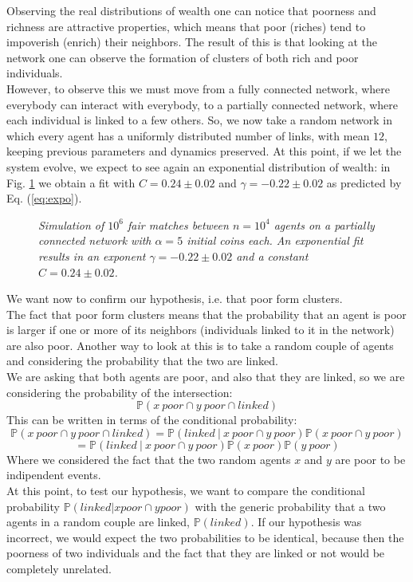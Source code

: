 Observing the real distributions of wealth one can notice that poorness and richness are attractive properties, which means that poor (riches) tend to impoverish (enrich) their neighbors.
The result of this is that looking at the network one can observe the formation of clusters of both rich and poor individuals. \\
However, to observe this we must move from a fully connected network, where everybody can interact with everybody, to a partially connected network, where each individual is linked to a few others.
So, we now take a random network in which every agent has a uniformly distributed number of links, with mean $12$, keeping previous parameters and dynamics preserved.
At this point, if we let the system evolve, we expect to see again an exponential distribution of wealth: in Fig. \ref{fig:fixedExpo} we obtain a fit with $C = 0.24 \pm 0.02$ and $\gamma = -0.22 \pm 0.02$ as predicted by Eq. (\ref{eq:expo}).
\begin{figure}[H]
    \centering
    \scalebox{.7}{}
    \caption{\emph{Simulation of $10^6$ fair matches between $n = 10^4$ agents on a partially connected network with $\alpha = 5$ initial coins each. 
                    An exponential fit results in an exponent $\gamma = -0.22 \pm 0.02$ and a constant $C = 0.24 \pm 0.02$.}}
    \label{fig:fixedExpo}
\end{figure}
We want now to confirm our hypothesis, i.e. that poor form clusters. \\
The fact that poor form clusters means that the probability that an agent is poor is larger if one or more of its neighbors (individuals linked to it in the network) are also poor. Another way to look at this is to take a random couple of agents and considering the probability that the two are linked. \\
We are asking that both agents are poor, and also that they are linked, so we are considering the probability of the intersection:
$$
	\mathbb{P}(x \ poor \cap y \ poor \cap linked)
$$
This can be written in terms of the conditional probability:
$$
	\mathbb{P}(x \ poor \cap y \ poor \cap linked) = \mathbb{P}(linked \ \vert \ x \ poor \cap y \ poor) \mathbb{P}(x \ poor \cap y \ poor) 
$$
$$
	= \mathbb{P}(linked \ \vert \ x \ poor \cap y \ poor) \mathbb{P}(x \ poor)\mathbb{P}(y \ poor) 
$$
Where we considered the fact that the two random agents $x$ and $y$ are poor to be indipendent events. \\
At this point, to test our hypothesis, we want to compare the conditional probability $\mathbb{P}(linked \vert x poor \cap y poor)$ with the generic probability that a two agents in a random couple are linked, $\mathbb{P}(linked)$. If our hypothesis was incorrect, we would expect the two probabilities to be identical, because then the poorness of two individuals and the fact that they are linked or not would be completely unrelated. \\
